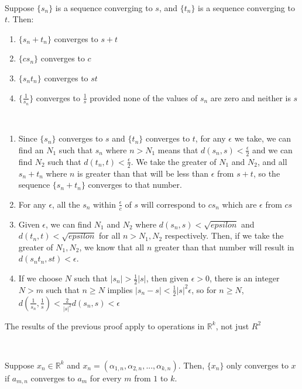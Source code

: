 \documentclass{article}
\begin{document}
\begin{theorem}
\

Suppose $\{s_n\}$ is a sequence converging to $s$, and $\{t_n\}$ is a sequence converging to $t$. Then:

\begin{enumerate}
    \item $\{s_n + t_n\}$ converges to $s+t$
    \item $\{cs_n\}$ converges to $c$
    \item $\{s_nt_n\}$ converges to $st$
    \item $\{\frac{1}{s_n}\}$ converges to $\frac{1}{s}$ provided none of the values of $s_n$ are zero and neither is $s$
\end{enumerate}
\end{theorem}

\begin{customproof}
\

\begin{enumerate}
    \item Since $\{s_n\}$ converges to $s$ and $\{t_n\}$ converges to $t$, for any $\epsilon$ we take, we can find an $N_1$ such that $s_n$ where $n>N_1$ means that $d(s_n, s) < \frac{\epsilon}{2}$ and we can find $N_2$ such that $d(t_n, t) < \frac{\epsilon}{2}$. We take the greater of $N_1$ and $N_2$, and all $s_n + t_n$ where $n$ is greater than that will be less than $\epsilon$ from $s + t$, so the sequence $\{s_n + t_n\}$ converges to that number.
    \item For any $\epsilon$, all the $s_n$ within $\frac{\epsilon}{c}$ of $s$ will correspond to $cs_n$ which are $\epsilon$ from $cs$
    \item Given $\epsilon$, we can find $N_1$ and $N_2$ where $d(s_n,s) < \sqrt{epsilon}$ and $d(t_n,t) < \sqrt{epsilon}$ for all $n > N_1, N_2$ respectively. Then, if we take the greater of $N_1, N_2$, we know that all $n$ greater than that number will result in $d(s_nt_n, st) < \epsilon$. 
    \item If we choose $N$ such that $\vert s_n \vert > \frac{1}{2} \vert s \vert$, then given $\epsilon > 0$, there is an integer $N > m$ such that $n \geq N$ implies $\vert s_n - s \vert < \frac{1}{2} \vert s \vert ^2 \epsilon$, so for $n \geq N$, $d(\frac{1}{s_n}, \frac{1}{s}) < \frac{2}{\vert s \vert^2} d(s_n, s) < \epsilon$
\end{enumerate}
\end{customproof}
The results of the previous proof apply to operations in $\mathbb{R}^k$, not just $R^2$
\begin{theorem}
\

Suppose $x_n \in \mathbb{R}^k$ and $x_n = (\alpha_{1,n}, \alpha_{2,n}, ..., \alpha_{k,n})$. Then, $\{x_n\}$ only converges to $x$ if $a_{m,n}$ converges to $a_m$ for every $m$ from $1$ to $k$.


\end{theorem}
\end{document}
